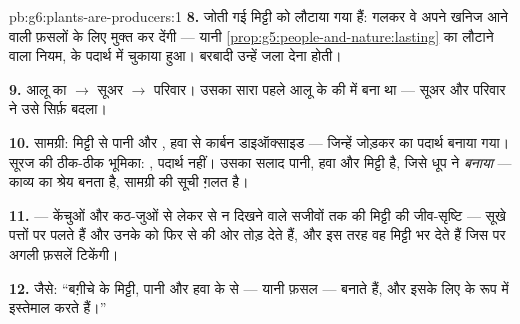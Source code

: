 \begin{solution}{pb:g6:plants-are-producers:1}
\textbf{8.} जोती गई  मिट्टी को लौटाया गया  हैं:
गलकर वे अपने खनिज आने वाली फ़सलों के लिए मुक्त कर देंगी --- यानी
\cref{prop:g5:people-and-nature:lasting} का लौटाने वाला नियम,  के
पदार्थ में चुकाया हुआ। बरबादी उन्हें जला देना होती।

\textbf{9.} आलू का  $\rightarrow$ सूअर $\rightarrow$ परिवार। उसका
सारा  पहले आलू के  की  में बना था --- सूअर
और परिवार ने उसे सिर्फ़ बदला।

\textbf{10.} सामग्री: मिट्टी से पानी और , हवा से कार्बन
डाइऑक्साइड --- जिन्हें जोड़कर  का पदार्थ बनाया गया। सूरज की
ठीक-ठीक भूमिका: , पदार्थ नहीं। उसका सलाद पानी, हवा और मिट्टी है,
जिसे धूप ने \emph{बनाया} --- काव्य का श्रेय बनता है, सामग्री की सूची
ग़लत है।

\textbf{11.}  --- केंचुओं और कठ-जुओं से लेकर  से न दिखने वाले
सजीवों तक की मिट्टी की जीव-सृष्टि --- सूखे पत्तों पर पलते हैं और उनके
 को फिर से  की ओर तोड़ देते हैं, और इस तरह वह
मिट्टी भर देते हैं जिस पर अगली फ़सलें टिकेंगी।

\textbf{12.} जैसे: ``बग़ीचे के  मिट्टी, पानी और हवा के  से  --- यानी फ़सल --- बनाते हैं, और इसके लिए
 के रूप में  इस्तेमाल करते हैं।''
\end{solution}
